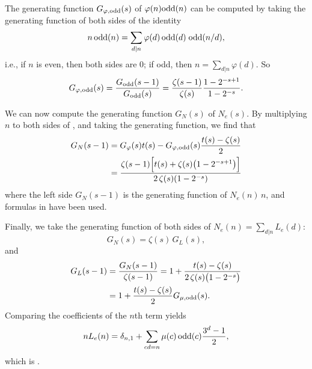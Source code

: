 \documentclass[twocolumn]{revtex4-1}
\begin{document}
The generating function $G_{\varphi,\mathrm{odd}}(s)$
of $\varphi(n) \mathrm{odd}(n)$ can be computed by taking the generating function
of both sides of the identity
\[
  n \, \mathrm{odd}(n)  = \sum_{d|n} \varphi(d) \, \mathrm{odd}(d) \; \mathrm{odd}(n/d),
\]
i.e., if $n$ is even, then both sides are 0;
if odd, then $n = \sum_{d|n} \varphi(d)$.
So
\[
  G_{\varphi,\mathrm{odd}}(s) = \frac{G_{\mathrm{odd}}(s-1)}{G_{\mathrm{odd}}(s)}
  = \frac{\zeta(s-1)}{\zeta(s)} \frac{1 - 2^{-s + 1}}{1 - 2^{-s}}.
\]


We can now compute the generating function $G_N(s)$ of $N_e(s)$.
By multiplying $n$ to both sides of ,
and taking the generating function,
we find that
\begin{align*}
  G_N(s - 1)
    &= G_\varphi(s) t(s)- G_{\varphi, \mathrm{odd}}(s) \frac{t(s)-\zeta(s)}{2} \\
    &=
      \frac{\zeta(s-1) \Big[ t(s) + \zeta(s) \big( 1  - 2^{-s+1} \big) \Big]  }
           {2 \, \zeta(s) (1 - 2^{-s}) }
\end{align*}
where the left side $G_N(s-1)$ is
  the generating function of $N_e(n) \, n$,
and formulas in  have been used.

Finally, we take the generating function of both sides of
 $N_e(n) = \sum_{d|n} L_e(d)$:
\[
  G_N(s) = \zeta(s) \, G_L(s),
\]
and
\begin{align*}
  G_L(s-1)
  & = \frac{G_N(s - 1)}{\zeta(s-1)}
  = 1
        + \frac{ t(s) - \zeta(s) }
          {2 \, \zeta(s) \big(1 - 2^{-s}\big)} \\
  &   = 1 + \frac{t(s) - \zeta(s)}{2} G_{\mu, \mathrm{odd}}(s).
\end{align*}
Comparing the coefficients of the $n$th term yields
\[
  n L_e(n) = \delta_{n,1} + \sum_{cd = n} \mu(c) \, \mathrm{odd}(c) \frac{3^d-1}{2},
\]
which is 
\big[also note $\delta_{n,1} = \sum_{c|n}\mu(c)$\big].
\end{document}
